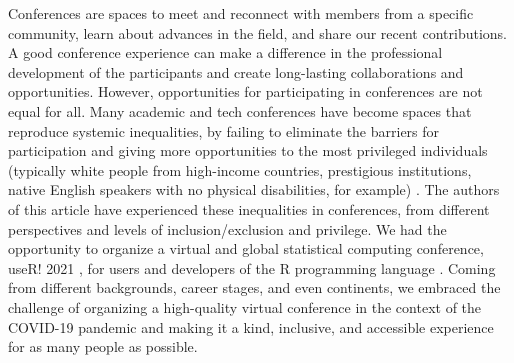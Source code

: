 \documentclass[10pt,letterpaper]{article}
\begin{document}
Conferences are spaces to meet and reconnect with members from a specific community, learn about advances in the field, and share our recent contributions.
A good conference experience can make a difference in the professional development of the participants and create long-lasting collaborations and opportunities. 
However, opportunities for participating in conferences are not equal for all. 
Many academic and tech conferences have become spaces that reproduce systemic inequalities, by failing to eliminate the barriers for participation and giving more opportunities to the most privileged individuals (typically white people from high-income countries, prestigious institutions, native English speakers with no physical disabilities, for example) \cite{arendDisparityConferenceRegistration2019, biggsAcademicConferenceChilly2018, depickerRethinkingInclusionDisability2020a, irishIncreasingParticipationUsing2020}.
The authors of this article have experienced these inequalities in conferences, from different perspectives and levels of inclusion/exclusion and privilege.
We had the opportunity to organize a virtual and global statistical computing conference, useR! 2021 \cite{sanchez-tapia_user_2021-2}, for users and developers of the R programming language \cite{r_core_team_2021}.
Coming from different backgrounds, career stages, and even continents, we embraced the challenge of organizing a high-quality virtual conference in the context of the COVID-19 pandemic and making it a kind, inclusive, and accessible experience for as many people as possible.
\end{document}
